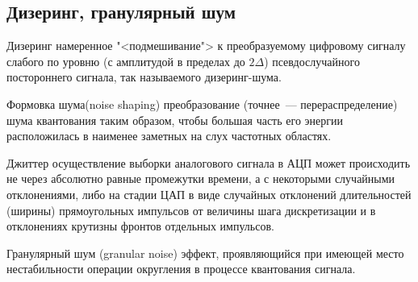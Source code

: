 \documentclass{beamer}
\begin{document}
\subsection{Дизеринг, гранулярный шум}
\begin{frame}
\begin{block}{Дизеринг}
намеренное "<подмешивание"> к преобразуемому цифровому сигналу слабого по уровню (с амплитудой в пределах до $2\Delta$) псевдослучайного постороннего сигнала, так называемого дизеринг-шума. 
\end{block}
\begin{block}{Формовка шума}(noise shaping) 
преобразование (точнее~--- перераспределение) шума квантования таким образом, чтобы большая часть его энергии расположилась в наименее заметных на слух частотных областях. 
\end{block}
\begin{block}{Джиттер}
осуществление выборки аналогового сигнала в АЦП может происходить не через абсолютно равные промежутки времени, а с некоторыми случайными отклонениями, либо на стадии ЦАП в виде случайных отклонений длительностей (ширины) прямоугольных импульсов от величины шага дискретизации и в отклонениях крутизны фронтов отдельных импульсов.
\end{block}
\end{frame}

\begin{frame}
\begin{block}{Гранулярный шум (granular noise) }
эффект, проявляющийся при имеющей место нестабильности операции округления в процессе квантования сигнала. 
\end{block}
\end{frame}
\end{document}
